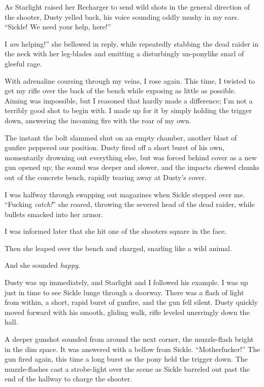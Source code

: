 As Starlight raised her Recharger to send wild shots in the general direction of the shooter, Dusty yelled back, his voice sounding oddly mushy in my ears. “Sickle! We need your help, here!”

\leavevmode{}I \textit{am} helping!” she bellowed in reply, while repeatedly stabbing the dead raider in the neck with her leg-blades and emitting a disturbingly un-ponylike snarl of gleeful rage.

With adrenaline coursing through my veins, I rose again. This time, I twisted to get my rifle over the back of the bench while exposing as little as possible. Aiming was impossible, but I reasoned that hardly made a difference; I’m not a terribly good shot to begin with. I made up for it by simply holding the trigger down, answering the incoming fire with the roar of my own.

The instant the bolt slammed shut on an empty chamber, another blast of gunfire peppered our position. Dusty fired off a short burst of his own, momentarily drowning out everything else, but was forced behind cover as a new gun opened up; the sound was deeper and slower, and the impacts chewed chunks out of the concrete bench, rapidly tearing away at Dusty’s cover.

I was halfway through swapping out magazines when Sickle stepped over me. “Fucking \textit{catch!}” she roared, throwing the severed head of the dead raider, while bullets smacked into her armor.

I was informed later that she hit one of the shooters square in the face.

Then she leaped over the bench and charged, snarling like a wild animal.

And she sounded \textit{happy}.

Dusty was up immediately, and Starlight and I followed his example. I was up just in time to see Sickle lunge through a doorway. There was a flash of light from within, a short, rapid burst of gunfire, and the gun fell silent. Dusty quickly moved forward with his smooth, gliding walk, rifle leveled unerringly down the hall.

A deeper gunshot sounded from around the next corner, the muzzle-flash bright in the dim space. It was answered with a bellow from Sickle. “Motherfucker!” The gun fired again, this time a long burst as the pony held the trigger down. The muzzle-flashes cast a strobe-light over the scene as Sickle barreled out past the end of the hallway to charge the shooter.

